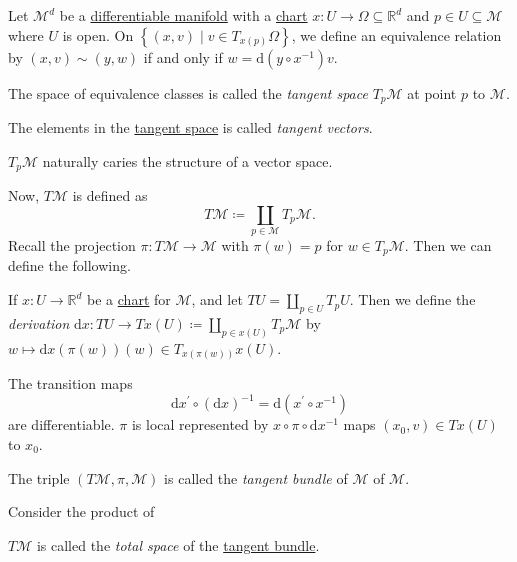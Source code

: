 \begin{definition*}
	Let \(\mathcal{M}^d \) be a \hyperref[def:smooth-manifold]{differentiable manifold} with a \hyperref[def:coordinate-chart]{chart} \(x\colon U \to \Omega \subseteq \mathbb{R} ^d\) and \(p\in U \subseteq \mathcal{M} \) where \(U\) is open. On \(\left\{ (x, v) \mid v\in T_{x(p)}\Omega \right\}\), we define an equivalence relation by \((x, v)\sim (y, w)\) if and only if \(w = \mathrm{d} (y \circ x ^{-1} )v\).

	\begin{definition}\label{def:tangent-space}
		The space of equivalence classes is called the \emph{tangent space} \(T_p \mathcal{M} \) at point \(p\) to \(\mathcal{M} \).
	\end{definition}
	\begin{definition}\label{def:tangent-vector}
		The elements in the \hyperref[def:tangent-space]{tangent space} is called \emph{tangent vectors}.
	\end{definition}
\end{definition*}

\begin{remark}
	\(T_p \mathcal{M} \) naturally caries the structure of a vector space.
\end{remark}

Now, \(T \mathcal{M} \) is defined as
\[
	T\mathcal{M} \coloneqq \coprod _{p\in \mathcal{M} }T_p \mathcal{M} .
\]
Recall the projection \(\pi \colon T\mathcal{M} \to  \mathcal{M} \) with \(\pi (w) = p\) for \(w\in T_p \mathcal{M} \). Then we can define the following.

\begin{definition}[Derivation]\label{def:derivation}
	If \(x\colon U \to  \mathbb{R} ^d\) be a \hyperref[def:coordinate-chart]{chart} for \(\mathcal{M} \), and let \(TU = \coprod_{p\in U} T_p U\). Then we define the \emph{derivation} \(\mathrm{d} x\colon TU \to  T x(U) \coloneqq \coprod_{p\in x(U)} T_p \mathcal{M} \) by \(w \mapsto \mathrm{d} x(\pi (w))(w)\in T_{x(\pi (w))} x(U)\).
\end{definition}

The transition maps
\[
	\mathrm{d} x^\prime \circ (\mathrm{d} x)^{-1}
	= \mathrm{d} (x^\prime \circ x ^{-1} )
\]
are differentiable. \(\pi \) is local represented by \(x \circ \pi \circ \mathrm{d} x ^{-1} \) maps \((x_0, v)\in Tx(U)\) to \(x_0\).

\begin{definition}\label{def:tangent-bundle}
	The triple \((T\mathcal{M} , \pi , \mathcal{M} )\) is called the \emph{tangent bundle} of \(\mathcal{M} \) of \(\mathcal{M} \).
\end{definition}
Consider the product of
\begin{definition}\label{def:total-space}
	\(T\mathcal{M} \) is called the \emph{total space} of the \hyperref[def:tangent-bundle]{tangent bundle}.
\end{definition}

